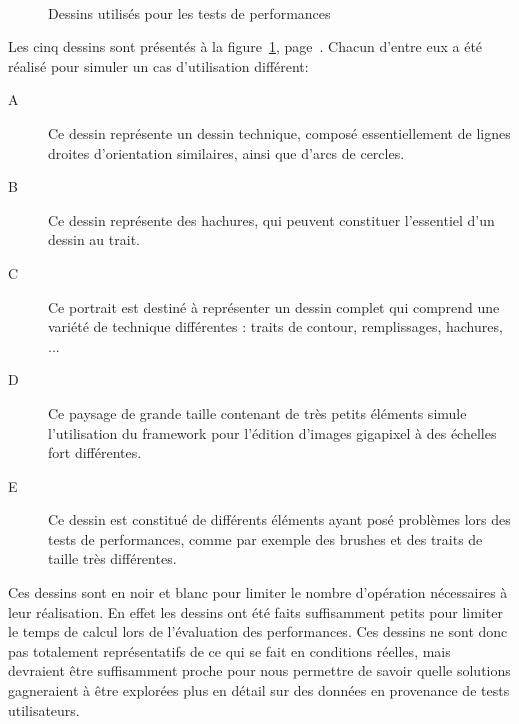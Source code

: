 \begin{figure}[h]
				\\
				\caption{Dessins utilisés pour les tests de performances}
				\label{fig:testdrawings}
			\end{figure}

			Les cinq dessins sont présentés à la figure~\ref{fig:testdrawings}, page~\pageref{fig:testdrawings}. Chacun d'entre eux a été
			réalisé pour simuler un cas d'utilisation différent:
			\begin{description}
				\item[A] Ce dessin représente un dessin technique, composé essentiellement de lignes droites d'orientation similaires, ainsi
				que d'arcs de cercles. 
				\item[B] Ce dessin représente des hachures, qui peuvent constituer l'essentiel d'un dessin au trait.
				\item[C] Ce portrait est destiné à représenter un dessin complet qui comprend une variété de technique différentes : traits de contour,
				remplissages, hachures, ...
				\item[D] Ce paysage de grande taille contenant de très petits éléments simule l'utilisation du framework pour l'édition d'images
				gigapixel à des échelles fort différentes.
				\item[E] Ce dessin est constitué de différents éléments ayant posé problèmes lors des tests de performances, comme par exemple 
				des brushes et des traits de taille très différentes. 
			\end{description}
			Ces dessins sont en noir et blanc pour limiter le nombre d'opération nécessaires à leur réalisation. En effet les dessins ont été faits 
			suffisamment petits pour limiter le temps de calcul lors de l'évaluation des performances. Ces dessins ne sont donc pas totalement
			représentatifs de ce qui se fait en conditions réelles, mais devraient être suffisamment proche pour nous permettre de savoir quelle
			solutions gagneraient à être explorées plus en détail sur des données en provenance de tests utilisateurs.


